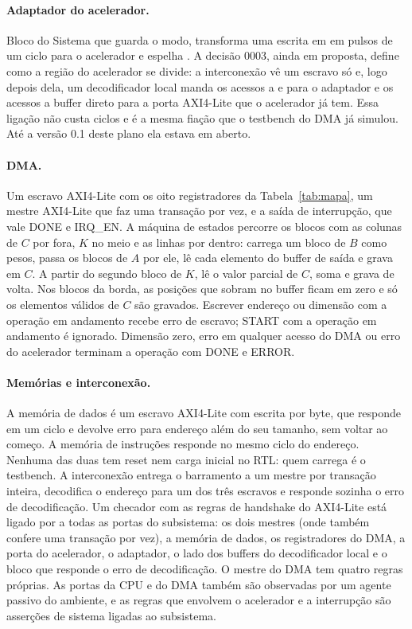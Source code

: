 \documentclass[10pt,a4paper]{article}
\newcommand{\code}[1]{\texttt{\detokenize{#1}}}
\begin{document}
\paragraph{Adaptador do acelerador.}
Bloco do Sistema que guarda o modo, transforma uma escrita em \code{CTRL} em pulsos de um ciclo
para o acelerador e espelha \code{STATUS}. A decisão 0003, ainda em proposta, define como a região
do acelerador se divide: a interconexão vê um escravo só e, logo depois dela, um decodificador
local manda os acessos a \code{CTRL} e \code{STATUS} para o adaptador e os acessos a buffer direto
para a porta AXI4-Lite que o acelerador já tem. Essa ligação não custa ciclos e é a mesma fiação
que o testbench do DMA já simulou. Até a versão 0.1 deste plano ela estava em aberto.

\paragraph{DMA.}
Um escravo AXI4-Lite com os oito registradores da Tabela~\ref{tab:mapa}, um mestre AXI4-Lite que
faz uma transação por vez, e a saída de interrupção, que vale DONE e IRQ\_EN. A máquina de estados
percorre os blocos com as colunas de $C$ por fora, $K$ no meio e as linhas por dentro: carrega um
bloco de $B$ como pesos, passa os blocos de $A$ por ele, lê cada elemento do buffer de saída e
grava em $C$. A partir do segundo bloco de $K$, lê o valor parcial de $C$, soma e grava de volta.
Nos blocos da borda, as posições que sobram no buffer ficam em zero e só os elementos válidos de
$C$ são gravados. Escrever endereço ou dimensão com a operação em andamento recebe erro de escravo;
START com a operação em andamento é ignorado. Dimensão zero, erro em qualquer acesso do DMA ou erro
do acelerador terminam a operação com DONE e ERROR.

\paragraph{Memórias e interconexão.}
A memória de dados é um escravo AXI4-Lite com escrita por byte, que responde em um ciclo e devolve
erro para endereço além do seu tamanho, sem voltar ao começo. A memória de instruções responde no
mesmo ciclo do endereço. Nenhuma das duas tem reset nem carga inicial no RTL: quem carrega é o
testbench. A interconexão entrega o barramento a um mestre por transação inteira, decodifica o
endereço para um dos três escravos e responde sozinha o erro de decodificação. Um checador com as
regras de handshake do AXI4-Lite está ligado por \code{bind} a todas as portas do subsistema: os
dois mestres (onde também confere uma transação por vez), a memória de dados, os registradores do
DMA, a porta do acelerador, o adaptador, o lado dos buffers do decodificador local e o bloco que
responde o erro de decodificação. O mestre do DMA tem quatro regras próprias. As portas da CPU e
do DMA também são observadas por um agente passivo do ambiente, e as regras que envolvem o
acelerador e a interrupção são asserções de sistema ligadas ao subsistema.
\end{document}
